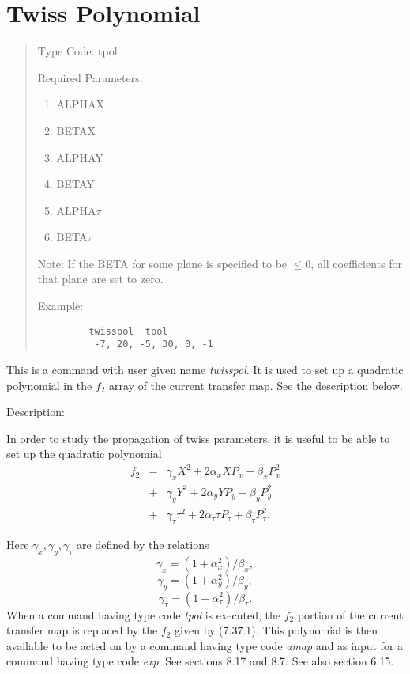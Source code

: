 \newpage
\section{Twiss Polynomial}
\begin{quotation}
\noindent Type Code:  tpol
\vspace{5mm}

\noindent Required Parameters:
\begin{enumerate}
     \item  ALPHAX
     \item  BETAX
     \item  ALPHAY
     \item  BETAY
     \item  ALPHA$\tau$
     \item  BETA$\tau$

\end{enumerate}

\vspace{5mm}
\noindent Note:  If the BETA for some plane is specified to be $\leq 0$, all
coefficients for that plane are set to zero.

\vspace{5mm}
\noindent     Example:
\begin{verbatim}
         twisspol  tpol
          -7, 20, -5, 30, 0, -1
\end{verbatim}
\end{quotation}
This is a command with user given name {\em twisspol}.  It is used to set up
a quadratic polynomial in the $f_2$ array of the current transfer map.
See the description below.

\vspace{5mm}
     Description:
\vspace{2mm}

In order to study the propagation of twiss parameters, it is useful to be
able to set up the quadratic polynomial
\begin{eqnarray}
f_2 &=& \gamma_x X^2 + 2\alpha_x XP_x + \beta_x P_x^2 \nonumber \\
&+& \gamma_y Y^2 + 2\alpha_y YP_y + \beta_y P_y^2 \nonumber \\
&+& \gamma_{\tau} \tau^2 + 2\alpha_{\tau} \tau P_{\tau} +
\beta_{\tau} P_{\tau}^2.
\end{eqnarray}

Here $\gamma_x, \gamma_y, \gamma_{\tau}$ are defined by the relations
\[
\gamma_x = (1 + \alpha_x^2)/\beta_x,
\]
\[
\gamma_y = (1 + \alpha^2_y)/\beta_y,
\]
\begin{equation}
\gamma_{\tau} = (1 + \alpha^2_{\tau})/\beta_{\tau}.
\end{equation}
When a command having type code {\em tpol} is executed, the $f_2$ portion
of the current transfer map is replaced by the $f_2$ given by (7.37.1).
This polynomial is then available to be acted on by a command having type
code {\em amap} and as input for a command having type code {\em exp}.
See sections 8.17 and 8.7.  See also section 6.15.

